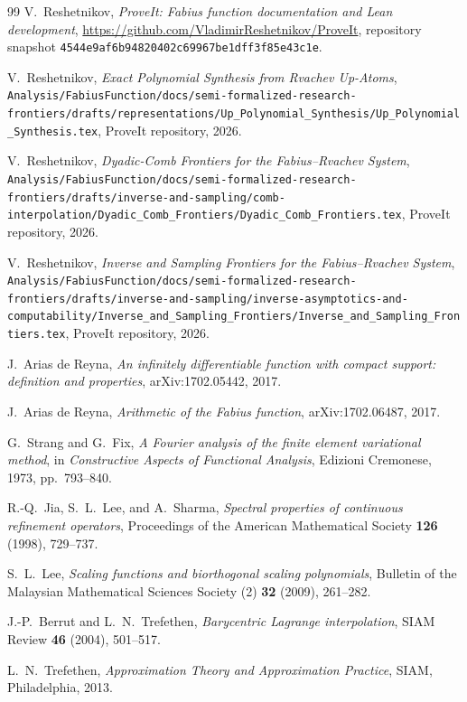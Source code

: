 \documentclass[11pt,oneside]{article}
\numberwithin{equation}{section}
\theoremstyle{definition}
\theoremstyle{remark}
\begin{document}
\begin{thebibliography}{99}
V.~Reshetnikov,
\emph{ProveIt: Fabius function documentation and Lean development},
\url{https://github.com/VladimirReshetnikov/ProveIt},
repository snapshot \texttt{4544e9af6b94820402c69967be1dff3f85e43c1e}.

V.~Reshetnikov,
\emph{Exact Polynomial Synthesis from Rvachev Up-Atoms},
\nolinkurl{Analysis/FabiusFunction/docs/semi-formalized-research-frontiers/drafts/representations/Up_Polynomial_Synthesis/Up_Polynomial_Synthesis.tex},
ProveIt repository, 2026.

V.~Reshetnikov,
\emph{Dyadic-Comb Frontiers for the Fabius--Rvachev System},
\nolinkurl{Analysis/FabiusFunction/docs/semi-formalized-research-frontiers/drafts/inverse-and-sampling/comb-interpolation/Dyadic_Comb_Frontiers/Dyadic_Comb_Frontiers.tex},
ProveIt repository, 2026.

V.~Reshetnikov,
\emph{Inverse and Sampling Frontiers for the Fabius--Rvachev System},
\nolinkurl{Analysis/FabiusFunction/docs/semi-formalized-research-frontiers/drafts/inverse-and-sampling/inverse-asymptotics-and-computability/Inverse_and_Sampling_Frontiers/Inverse_and_Sampling_Frontiers.tex},
ProveIt repository, 2026.

J.~Arias de Reyna,
\emph{An infinitely differentiable function with compact support: definition and properties},
arXiv:1702.05442, 2017.

J.~Arias de Reyna,
\emph{Arithmetic of the Fabius function},
arXiv:1702.06487, 2017.

G.~Strang and G.~Fix,
\emph{A Fourier analysis of the finite element variational method},
in \emph{Constructive Aspects of Functional Analysis}, Edizioni Cremonese,
1973, pp.~793--840.

R.-Q.~Jia, S.~L.~Lee, and A.~Sharma,
\emph{Spectral properties of continuous refinement operators},
Proceedings of the American Mathematical Society \textbf{126} (1998), 729--737.

S.~L.~Lee,
\emph{Scaling functions and biorthogonal scaling polynomials},
Bulletin of the Malaysian Mathematical Sciences Society (2) \textbf{32} (2009),
261--282.

J.-P.~Berrut and L.~N.~Trefethen,
\emph{Barycentric Lagrange interpolation},
SIAM Review \textbf{46} (2004), 501--517.

L.~N.~Trefethen,
\emph{Approximation Theory and Approximation Practice},
SIAM, Philadelphia, 2013.
\end{thebibliography}
\end{document}

